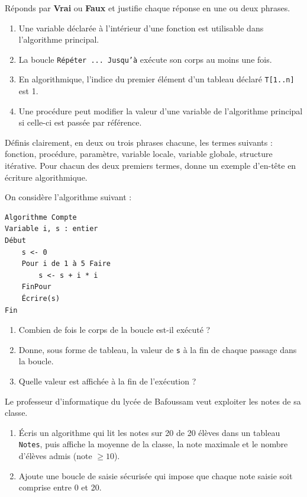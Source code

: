 \documentclass[11pt]{article}
\newcommand{\cle}[1]{{\popxbold\color{popdark}#1}}
\newcounter{popsec}
\newcounter{popsub}
\newcommand{\courssub}[1]{%
  \stepcounter{popsub}%
  \par\vspace{9pt}\noindent{\popxbold\fontsize{11.5}{13}\selectfont\color{popink}{\color{poporange}\thepopsec.\thepopsub}\hspace{6pt}#1}\par\nopagebreak\vspace{4pt}
}
\begin{document}
\begin{exercice}
Réponds par \textbf{Vrai} ou \textbf{Faux} et justifie chaque réponse en une ou deux phrases.
\begin{enumerate}
  \item Une variable déclarée à l'intérieur d'une fonction est utilisable dans l'algorithme principal.
  \item La boucle \texttt{Répéter ... Jusqu'à} exécute son corps au moins une fois.
  \item En algorithmique, l'indice du premier élément d'un tableau déclaré \texttt{T[1..n]} est 1.
  \item Une procédure peut modifier la valeur d'une variable de l'algorithme principal si celle-ci est passée par référence.
\end{enumerate}
\end{exercice}

\begin{exercice}[Définitions]
Définis clairement, en deux ou trois phrases chacune, les termes suivants : \cle{fonction}, \cle{procédure}, \cle{paramètre}, \cle{variable locale}, \cle{variable globale}, \cle{structure itérative}. Pour chacun des deux premiers termes, donne un exemple d'en-tête en écriture algorithmique.
\end{exercice}

\begin{exercice}
On considère l'algorithme suivant :
\begin{lstlisting}
Algorithme Compte
Variable i, s : entier
Début
    s <- 0
    Pour i de 1 à 5 Faire
        s <- s + i * i
    FinPour
    Écrire(s)
Fin
\end{lstlisting}
\begin{enumerate}
  \item Combien de fois le corps de la boucle est-il exécuté ?
  \item Donne, sous forme de tableau, la valeur de \texttt{s} à la fin de chaque passage dans la boucle.
  \item Quelle valeur est affichée à la fin de l'exécution ?
\end{enumerate}
\end{exercice}

\courssub{Je m'entraîne}

\begin{exercice}
Le professeur d'informatique du lycée de Bafoussam veut exploiter les notes de sa classe.
\begin{enumerate}
  \item Écris un algorithme qui lit les notes sur 20 de 20 élèves dans un tableau \texttt{Notes}, puis affiche la moyenne de la classe, la note maximale et le nombre d'élèves admis (note $\geq 10$).
  \item Ajoute une boucle de saisie sécurisée qui impose que chaque note saisie soit comprise entre 0 et 20.
\end{enumerate}
\end{exercice}
\end{document}
